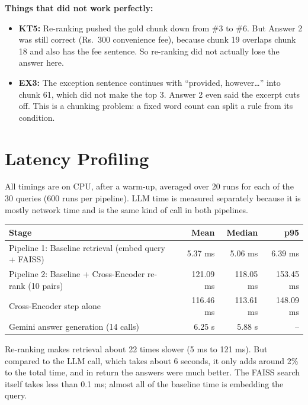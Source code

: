 \documentclass[11pt,a4paper]{article}
\begin{document}
\textbf{Things that did not work perfectly:}
\begin{itemize}
  \item \textbf{KT5:} Re-ranking pushed the gold chunk down from \#3 to \#6. But Answer 2 was still correct (Rs.\ 300
        convenience fee), because chunk 19 overlaps chunk 18 and also has the fee sentence. So re-ranking did not
        actually lose the answer here.
  \item \textbf{EX3:} The exception sentence continues with ``provided, however\ldots'' into chunk 61, which did
        not make the top 3. Answer 2 even said the excerpt cuts off. This is a chunking problem: a fixed word count
        can split a rule from its condition.
\end{itemize}

\section{Latency Profiling}

All timings are on CPU, after a warm-up, averaged over 20 runs for each of the 30 queries (600 runs per pipeline).
LLM time is measured separately because it is mostly network time and is the same kind of call in both pipelines.

\begin{center}
\begin{tabular}{lrrr}
\toprule
\textbf{Stage} & \textbf{Mean} & \textbf{Median} & \textbf{p95} \\
\midrule
Pipeline 1: Baseline retrieval (embed query + FAISS)   & 5.37 ms   & 5.06 ms   & 6.39 ms \\
Pipeline 2: Baseline + Cross-Encoder re-rank (10 pairs) & 121.09 ms & 118.05 ms & 153.45 ms \\
\quad Cross-Encoder step alone                          & 116.46 ms & 113.61 ms & 148.09 ms \\
\midrule
Gemini answer generation (14 calls)                     & 6.25 s    & 5.88 s    & -- \\
\bottomrule
\end{tabular}
\end{center}

Re-ranking makes retrieval about 22 times slower (5 ms to 121 ms). But compared to the LLM call, which takes about
6 seconds, it only adds around 2\% to the total time, and in return the answers were much better.
The FAISS search itself takes less than 0.1 ms; almost all of the baseline time is embedding the query.
\end{document}
